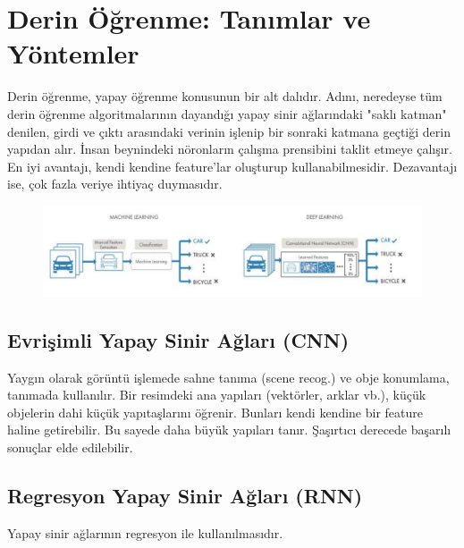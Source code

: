 \documentclass[12pt,a4paper]{article}
\begin{document}
    
    \newpage

    \tableofcontents
    \newpage


    \section{Derin Öğrenme: Tanımlar ve Yöntemler}
	Derin öğrenme, yapay öğrenme konusunun bir alt dalıdır. Adını, neredeyse tüm derin öğrenme
	algoritmalarının dayandığı yapay sinir ağlarındaki "saklı katman" denilen, girdi ve çıktı
	arasındaki verinin işlenip bir sonraki katmana geçtiği derin yapıdan alır. İnsan beynindeki
	nöronların çalışma prensibini taklit etmeye çalışır. En iyi avantajı, kendi kendine feature’lar
	oluşturup kullanabilmesidir. Dezavantajı ise, çok fazla veriye ihtiyaç duymasıdır.

    \begin{figure}[!h]
        \begin{center}
            \includegraphics[width=\linewidth]{resimler/dl1.png}
        \end{center}
    \end{figure}

	\subsection{Evrişimli Yapay Sinir Ağları (CNN)}
	Yaygın olarak görüntü işlemede sahne tanıma (scene recog.) ve obje konumlama, tanımada
	kullanılır. Bir resimdeki ana yapıları (vektörler, arklar vb.), küçük objelerin dahi küçük
	yapıtaşlarını öğrenir. Bunları kendi kendine bir feature haline getirebilir. Bu sayede daha
	büyük yapıları tanır. Şaşırtıcı derecede başarılı sonuçlar elde edilebilir.

	\subsection{Regresyon Yapay Sinir Ağları (RNN)}
	Yapay sinir ağlarının regresyon ile kullanılmasıdır.
\end{document}
